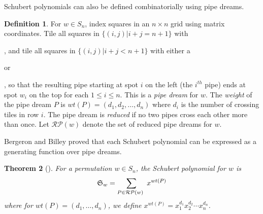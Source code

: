 \documentclass{article}
\newtheorem{theorem}{Theorem}[section]
\theoremstyle{definition}
\newtheorem{definition}[theorem]{Definition} %
\begin{document}
Schubert polynomials can also be defined combinatorially using pipe dreams.

\begin{definition}
   For $w\in S_n$, index squares in an $n \times n$ grid using matrix coordinates. Tile all squares in $\{(i,j)|i+j = n +1 \}$ with
   , and tile all squares in $\{(i,j)|i+j < n +1 \}$ with either a %
or
, so that the resulting pipe starting at spot $i$ on the left (the $i^{th}$ pipe) ends at spot $w_i$ on the top for each $1 \leq i \leq n$. This is a \emph{pipe dream} for $w$. 
The \emph{weight} of the pipe dream $P$ is $wt(P)=(d_1,d_2, \dots , d_n)$ where $d_i$ is the number of crossing tiles in row $i$.  
The pipe dream is \emph{reduced} if no two pipes cross each other more than once. Let $\mathcal{RP}(w)$ denote the set of reduced pipe dreams for $w$. 
\end{definition}

Bergeron and Billey proved that each Schubert polynomial can be expressed as a generating function over pipe dreams.

\begin{theorem}[\cite{billey1993some}]
 For a permutation $w \in S_n$, the \emph{Schubert polynomial} for $w$ is
$$\mathfrak{S}_w = \sum_{P \in \RP(w) \ }  x^{wt(P)}$$ 
where for $wt(P) = (d_1, \dots , d_n)$, we define $x^{wt(P)} = x_1^{d_1} x_2^{d_2} \cdots x_n^{d_n}$.
\end{theorem}

 
\end{document}
